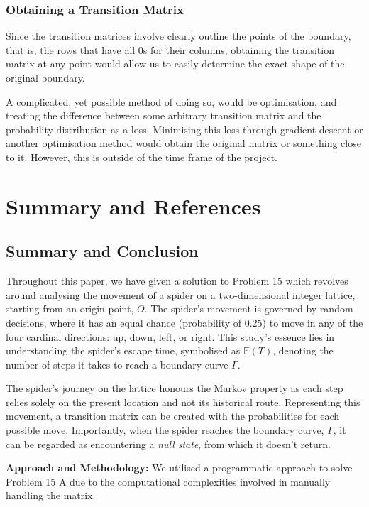 \documentclass[12pt,a4paper]{article}
\begin{document}
\subsubsection{Obtaining a Transition Matrix}
Since the transition matrices involve clearly outline the points of the boundary, that is, the rows that have all 0s for their columns, obtaining the transition matrix at any point would allow us to easily determine the exact shape of the original boundary.

A complicated, yet possible method of doing so, would be optimisation, and treating the difference between some arbitrary transition matrix and the probability distribution as a loss. Minimising this loss through gradient descent or another optimisation method would obtain the original matrix or something close to it. However, this is outside of the time frame of the project. 

\section{Summary and References}

\subsection{Summary and Conclusion}

Throughout this paper, we have given a solution to Problem 15 which revolves around analysing the movement of a spider on a two-dimensional integer lattice, starting from an origin point, 
$O$. The spider's movement is governed by random decisions, where it has an equal chance (probability of 0.25) to move in any of the four cardinal directions: up, down, left, or right. This study's essence lies in understanding the spider's escape time, symbolised as $\mathbb{E}(T)$, denoting the number of steps it takes to reach a boundary curve $\Gamma$.

The spider's journey on the lattice honours the Markov property as each step relies solely on the present location and not its historical route. Representing this movement, a transition matrix can be created with the probabilities for each possible move. Importantly, when the spider reaches the boundary curve, \(\Gamma\), it can be regarded as encountering a \textit{null state}, from which it doesn't return.

\textbf{Approach and Methodology:}
We utilised a programmatic approach to solve Problem 15 A due to the computational complexities involved in manually handling the matrix.
\end{document}
